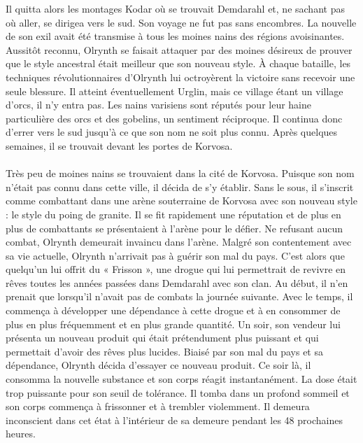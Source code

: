\documentclass[main.tex]{subfiles}
\begin{document}
    Il quitta alors les montages Kodar où se trouvait Demdarahl et, ne sachant pas où aller, se dirigea vers le sud.
    Son voyage ne fut pas sans encombres. La nouvelle de son exil avait été transmise à tous les moines nains des régions avoisinantes.
    Aussitôt reconnu, Olrynth se faisait attaquer par des moines désireux de prouver que le style ancestral était meilleur que son nouveau style.
    À chaque bataille, les techniques révolutionnaires d'Olrynth lui octroyèrent la victoire sans recevoir une seule blessure.
    Il atteint éventuellement Urglin, mais ce village étant un village d'orcs, il n'y entra pas.
    Les nains varisiens sont réputés pour leur haine particulière des orcs et des gobelins, un sentiment réciproque.
    Il continua donc d'errer vers le sud jusqu'à ce que son nom ne soit plus connu.
    Après quelques semaines, il se trouvait devant les portes de Korvosa.\\
    \\
    Très peu de moines nains se trouvaient dans la cité de Korvosa. 
    Puisque son nom n'était pas connu dans cette ville, il décida de s'y établir.
    Sans le sous, il s'inscrit comme combattant dans une arène souterraine de Korvosa avec son nouveau style : le style du poing de granite.
    Il se fit rapidement une réputation et de plus en plus de combattants se présentaient à l'arène pour le défier.
    Ne refusant aucun combat, Olrynth demeurait invaincu dans l'arène.
    Malgré son contentement avec sa vie actuelle, Olrynth n'arrivait pas à guérir son mal du pays.
    C'est alors que quelqu'un lui offrit du « Frisson », une drogue qui lui permettrait de revivre en rêves toutes les années passées dans Demdarahl avec son clan.
    Au début, il n'en prenait que lorsqu'il n'avait pas de combats la journée suivante.
    Avec le temps, il commença à développer une dépendance à cette drogue et à en consommer de plus en plus fréquemment et en plus grande quantité.
    Un soir, son vendeur lui présenta un nouveau produit qui était prétendument plus puissant et qui permettait d'avoir des rêves plus lucides.
    Biaisé par son mal du pays et sa dépendance, Olrynth décida d'essayer ce nouveau produit.
    Ce soir là, il consomma la nouvelle substance et son corps réagit instantanément. 
    La dose était trop puissante pour son seuil de tolérance. 
    Il tomba dans un profond sommeil et son corps commença à frissonner et à trembler violemment.
    Il demeura inconscient dans cet état à l'intérieur de sa demeure pendant les 48 prochaines heures.\\
    \\
\end{document}
